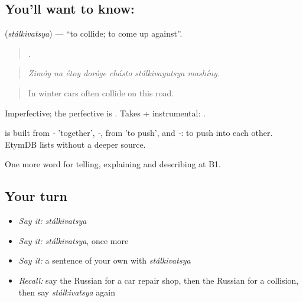 \subsection*{You'll want to know: }
\textbf{} (\emph{stálkivatsya}) — \textquotedblleft{}to collide; to come up against\textquotedblright{}.

\begin{quote}
      .
\end{quote}

\begin{quote}
\emph{Zimóy na étoy doróge chásto stálkivayutsya mashíny.}
\end{quote}

\begin{quote}
In winter cars often collide on this road.
\end{quote}

Imperfective; the perfective is \emph{}. Takes \emph{} + instrumental: \emph{  }.

\begin{cousinweb}
\emph{} is built from \emph{-} 'together', \emph{-}, from \emph{} 'to push', and \emph{-}: to push into each other. EtymDB lists \emph{} without a deeper source.
\end{cousinweb}

\begin{grammarlens}[title={What you've built}]
One more word for telling, explaining and describing at B1.
\end{grammarlens}

\subsection*{Your turn}
\begin{itemize}
\raggedright
  \item \emph{Say it:} \emph{stálkivatsya}
  \item \emph{Say it:} \emph{stálkivatsya}, once more
  \item \emph{Say it:} a sentence of your own with \emph{stálkivatsya}
  \item \emph{Recall:} say the Russian for a car repair shop, then the Russian for a collision, then say \emph{stálkivatsya} again
\end{itemize}

